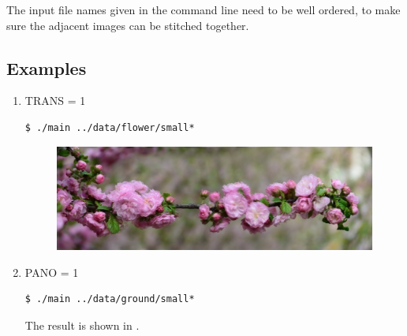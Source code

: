 The input file names given in the command line need to be well ordered, to make sure the adjacent images can be stitched together.

\subsection{Examples}
\begin{enumerate}
\item TRANS = 1
  \begin{lstlisting}
$ ./main ../data/flower/small*
  \end{lstlisting}
\begin{figure}[H]
  \centering
  \includegraphics[scale=0.27]{res/small.png}
\end{figure}


  \item PANO = 1
    \begin{lstlisting}
$ ./main ../data/ground/small*
    \end{lstlisting}
    The result is shown in .
\end{enumerate}

